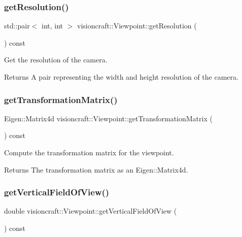 \subsubsection{\texorpdfstring{get\+Resolution()}{getResolution()}}
{\footnotesize\ttfamily std\+::pair$<$ int, int $>$ visioncraft\+::\+Viewpoint\+::get\+Resolution (\begin{DoxyParamCaption}{ }\end{DoxyParamCaption}) const}



Get the resolution of the camera. 

\begin{DoxyReturn}{Returns}
A pair representing the width and height resolution of the camera. 
\end{DoxyReturn}
\mbox{\label{classvisioncraft_1_1Viewpoint_af918ce4f4c39be7d461b9f80ee442120}} 
\subsubsection{\texorpdfstring{get\+Transformation\+Matrix()}{getTransformationMatrix()}}
{\footnotesize\ttfamily Eigen\+::\+Matrix4d visioncraft\+::\+Viewpoint\+::get\+Transformation\+Matrix (\begin{DoxyParamCaption}{ }\end{DoxyParamCaption}) const}



Compute the transformation matrix for the viewpoint. 

\begin{DoxyReturn}{Returns}
The transformation matrix as an Eigen\+::\+Matrix4d. 
\end{DoxyReturn}
\mbox{\label{classvisioncraft_1_1Viewpoint_a40e3661d2b20eedcefac03fb9859522f}} 
\subsubsection{\texorpdfstring{get\+Vertical\+Field\+Of\+View()}{getVerticalFieldOfView()}}
{\footnotesize\ttfamily double visioncraft\+::\+Viewpoint\+::get\+Vertical\+Field\+Of\+View (\begin{DoxyParamCaption}{ }\end{DoxyParamCaption}) const}




